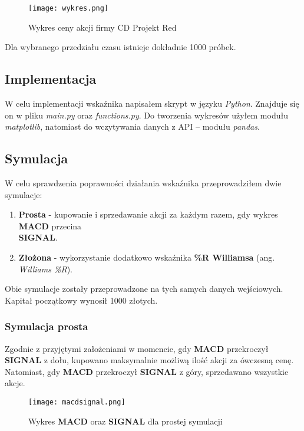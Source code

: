 \documentclass{article}
\begin{document}
    \begin{figure}[H]
        \texttt{[image: wykres.png]}
        \centering
        \caption{Wykres ceny akcji firmy CD Projekt Red}
    \end{figure}

    Dla wybranego przedziału czasu istnieje dokładnie 1000 próbek.

    \subsection{Implementacja}

    W celu implementacji wskaźnika napisałem skrypt w języku \textit{Python}.
    Znajduje się on w pliku \textit{main.py} oraz \textit{functions.py}. Do tworzenia wykresów
    użyłem modułu \textit{matplotlib}, natomiast do wczytywania danych z API -- modułu \textit{pandas}.
    \subsection{Symulacja}
    W celu sprawdzenia poprawności działania wskaźnika przeprowadziłem dwie symulacje:
    \begin{enumerate}
        \item \textbf{Prosta} - kupowanie i sprzedawanie akcji za każdym razem, gdy wykres \textbf{MACD} przecina \\ \textbf{SIGNAL}.
        \item \textbf{Złożona} - wykorzystanie dodatkowo wskaźnika \textbf{\%R Williamsa} (ang. \textit{Williams \%R}).
    \end{enumerate}
   
    Obie symulacje zostały przeprowadzone na tych samych danych wejściowych. Kapitał początkowy wynosił 1000 złotych. 

    \subsubsection{Symulacja prosta}

    Zgodnie z przyjętymi założeniami w momencie, gdy \textbf{MACD} przekroczył \textbf{SIGNAL} z dołu, kupowano maksymalnie możliwą ilość akcji 
    za ówczesną cenę.
    Natomiast, gdy \textbf{MACD} przekroczył \textbf{SIGNAL} z góry, sprzedawano wszystkie akcje.
    
    \begin{figure}[H]
        \texttt{[image: macdsignal.png]}
        \centering
        \caption{Wykres \textbf{MACD} oraz \textbf{SIGNAL} dla prostej symulacji}
    \end{figure}
\end{document}

